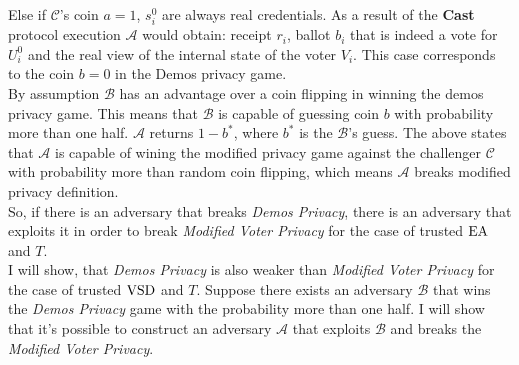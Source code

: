  Else if $\mathcal{C}$'s coin $a=1$, $s^0_i$ are always real credentials. As a result of the \textbf{Cast}  protocol execution $\mathcal{A}$ would obtain: receipt $r_i$, ballot $b_i$ that is indeed a vote for $U^0_i$  and the real view of the internal state of the voter $V_i$. This case corresponds to the coin $b=0$ in the Demos privacy game.\\
 
By assumption $\mathcal{B}$ has an advantage over a coin flipping in winning the demos privacy game. This means that  $\mathcal{B}$ is capable of guessing coin $b$ with probability more than one half.  $\mathcal{A}$ returns $1-b^*$, where $b^*$ is the $\mathcal{B}$'s guess. The above states that $\mathcal{A}$ is capable of wining the modified privacy game against  the challenger $\mathcal{C}$ with probability more than random coin flipping, which means $\mathcal{A}$ breaks modified privacy definition. \\

So, if there is an adversary that breaks \textit{Demos Privacy}, there is an adversary that exploits it in order to  break \textit{Modified Voter Privacy} for the case of trusted $\operatorname{EA}$ and $T$. \\

I will show, that \textit{Demos Privacy} is also weaker than  \textit{Modified Voter Privacy} for the case of trusted $\operatorname{VSD}$ and $T$. Suppose there exists an adversary $\mathcal{B}$ that wins the \textit{Demos Privacy} game with the probability more than one half. I will show that it's possible to construct an adversary $\mathcal{A}$ that exploits $\mathcal{B}$ and breaks the \textit{Modified Voter Privacy}.\\

